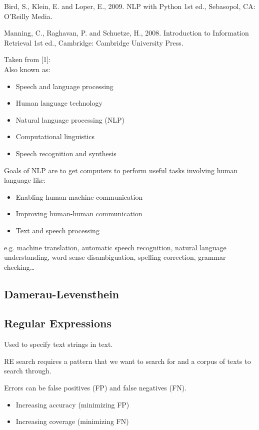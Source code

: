 Bird, S., Klein, E. and Loper, E., 2009. NLP with Python 1st ed., Sebasopol, CA: O'Reilly Media.\citep{Bird2009}

Manning, C., Raghavan, P. and Schuetze, H., 2008. Introduction to Information Retrieval 1st ed., Cambridge: Cambridge University Press.\citep{Manning2009}

Taken from [1]:\citep{Jurafsky2009}\\
Also known as:\\
\begin{itemize}
  \item Speech and language processing
  \item Human language technology
  \item Natural language processing (NLP)
  \item Computational linguistics
  \item Speech recognition and synthesis
\end{itemize}

Goals of NLP are to get computers to perform useful tasks involving human language like:
\begin{itemize}
  \item Enabling human-machine communication
  \item Improving human-human communication
  \item Text and speech processing
\end{itemize}

e.g. machine translation, automatic speech recognition, natural language understanding, word sense disambiguation, spelling correction, grammar checking…

\subsection{Damerau-Levensthein}

\subsection*{Regular Expressions}

Used to specify text strings in text.

RE search requires a pattern that we want to search for and a corpus of texts to search through.

Errors can be false positives (FP) and false negatives (FN).

\begin{itemize}
  \item Increasing accuracy (minimizing FP)
  \item Increasing coverage (minimizing FN)
\end{itemize}

